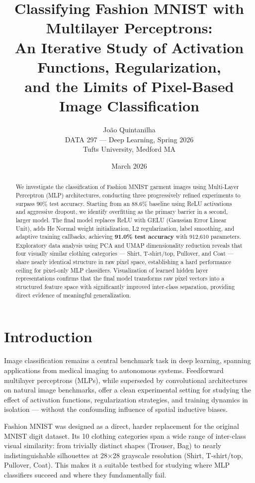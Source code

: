 \documentclass[12pt,letterpaper]{article}
\title{
    \textbf{Classifying Fashion MNIST with Multilayer Perceptrons:}\\
    \large An Iterative Study of Activation Functions, Regularization,\\and the Limits of Pixel-Based Image Classification
}
\author{
    João Quintanilha\\
    \small DATA 297 — Deep Learning, Spring 2026\\
    \small Tufts University, Medford MA
}
\date{March 2026}
\begin{document}
\maketitle
\thispagestyle{empty}

\begin{abstract}
We investigate the classification of Fashion MNIST garment images using Multi-Layer Perceptron (MLP) architectures, conducting three progressively refined experiments to surpass 90\% test accuracy. Starting from an 88.6\% baseline using ReLU activations and aggressive dropout, we identify overfitting as the primary barrier in a second, larger model. The final model replaces ReLU with GELU (Gaussian Error Linear Unit), adds He Normal weight initialization, L2 regularization, label smoothing, and adaptive training callbacks, achieving \textbf{91.0\% test accuracy} with 912,610 parameters. Exploratory data analysis using PCA and UMAP dimensionality reduction reveals that four visually similar clothing categories — Shirt, T-shirt/top, Pullover, and Coat — share nearly identical structure in raw pixel space, establishing a hard performance ceiling for pixel-only MLP classifiers. Visualization of learned hidden layer representations confirms that the final model transforms raw pixel vectors into a structured feature space with significantly improved inter-class separation, providing direct evidence of meaningful generalization.
\end{abstract}

\newpage
\tableofcontents
\newpage

\section{Introduction}
\label{sec:intro}

Image classification remains a central benchmark task in deep learning, spanning applications from medical imaging to autonomous systems. Feedforward multilayer perceptrons (MLPs), while superseded by convolutional architectures on natural image benchmarks, offer a clean experimental setting for studying the effect of activation functions, regularization strategies, and training dynamics in isolation — without the confounding influence of spatial inductive biases.

Fashion MNIST \citep{xiao2017fashion} was designed as a direct, harder replacement for the original MNIST digit dataset. Its 10 clothing categories span a wide range of inter-class visual similarity: from trivially distinct shapes (Trouser, Bag) to nearly indistinguishable silhouettes at 28×28 grayscale resolution (Shirt, T-shirt/top, Pullover, Coat). This makes it a suitable testbed for studying where MLP classifiers succeed and where they fundamentally fail.
\end{document}
